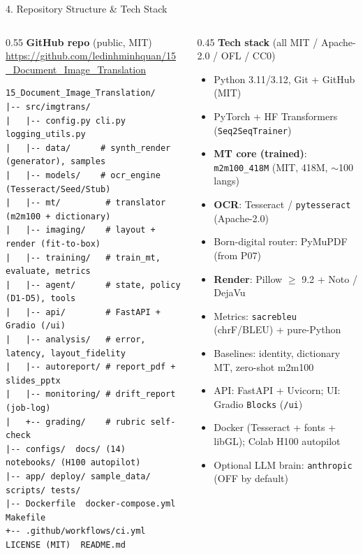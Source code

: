 \documentclass[10pt,aspectratio=169]{beamer}
\begin{document}
\begin{frame}[fragile]{4. Repository Structure \& Tech Stack}
\begin{columns}[T]
\begin{column}{0.55\textwidth}
\textbf{GitHub repo} (public, MIT) \\
\scriptsize \url{https://github.com/ledinhminhquan/15_Document_Image_Translation}

\vspace{0.1cm}
\begin{lstlisting}[basicstyle=\ttfamily\tiny]
15_Document_Image_Translation/
|-- src/imgtrans/
|   |-- config.py cli.py logging_utils.py
|   |-- data/      # synth_render (generator), samples
|   |-- models/    # ocr_engine (Tesseract/Seed/Stub)
|   |-- mt/         # translator (m2m100 + dictionary)
|   |-- imaging/    # layout + render (fit-to-box)
|   |-- training/   # train_mt, evaluate, metrics
|   |-- agent/      # state, policy (D1-D5), tools
|   |-- api/        # FastAPI + Gradio (/ui)
|   |-- analysis/   # error, latency, layout_fidelity
|   |-- autoreport/ # report_pdf + slides_pptx
|   |-- monitoring/ # drift_report (job-log)
|   +-- grading/    # rubric self-check
|-- configs/  docs/ (14)  notebooks/ (H100 autopilot)
|-- app/ deploy/ sample_data/ scripts/ tests/
|-- Dockerfile  docker-compose.yml  Makefile
+-- .github/workflows/ci.yml  LICENSE (MIT)  README.md
\end{lstlisting}
\end{column}
\begin{column}{0.45\textwidth}
\textbf{Tech stack} {\scriptsize(all MIT / Apache-2.0 / OFL / CC0)}
\begin{itemize}\scriptsize
  \item Python 3.11/3.12, Git + GitHub (MIT)
  \item PyTorch + HF Transformers (\texttt{Seq2SeqTrainer})
  \item \textbf{MT core (trained)}: \texttt{m2m100\_418M} (MIT, 418M, $\sim$100 langs)
  \item \textbf{OCR}: Tesseract / \texttt{pytesseract} (Apache-2.0)
  \item Born-digital router: PyMuPDF (from P07)
  \item \textbf{Render}: Pillow $\geq$ 9.2 + Noto / DejaVu
  \item Metrics: \texttt{sacrebleu} (chrF/BLEU) + pure-Python
  \item Baselines: identity, dictionary MT, zero-shot m2m100
  \item API: FastAPI + Uvicorn; UI: Gradio \texttt{Blocks} (\texttt{/ui})
  \item Docker (Tesseract + fonts + libGL); Colab H100 autopilot
  \item Optional LLM brain: \texttt{anthropic} (OFF by default)
\end{itemize}
\end{column}
\end{columns}
\end{frame}
\end{document}
